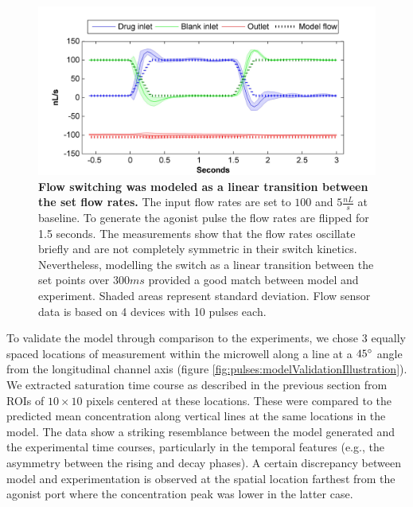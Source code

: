   \begin{figure}[!htb]
       \centering
       \includegraphics[width=15cm]{chapter6/figures/flowPulse/flowPulse.jpg}
       \caption[Measured and model flow rate switches during an agonist pulse]{\textbf{Flow switching was modeled as a linear transition between the set flow rates.} The input flow rates are set to \(100\) and \(5\frac{nL}{s}\) at baseline. To generate the agonist pulse the flow rates are flipped for 1.5 seconds. The measurements show that the flow rates oscillate briefly and are not completely symmetric in their switch kinetics. Nevertheless, modelling the switch as a linear transition between the set points over \(300ms\) provided a good match between model and experiment. Shaded areas represent standard deviation. Flow sensor data is based on 4 devices with 10 pulses each.}
       \label{fig:pulses:flowPulse}
  \end{figure}

To validate the model through comparison to the experiments, we chose 3 equally spaced locations of measurement within the microwell along a line at a \(45\degree\) angle from the longitudinal channel axis (figure \ref{fig:pulses:modelValidationIllustration}). We extracted saturation time course as described in the previous section from ROIs of \(10\times 10\) pixels centered at these locations. These were compared to the predicted mean concentration along vertical lines at the same locations in the model. The data show a striking resemblance between the model generated and the experimental time courses, particularly in the temporal features (e.g., the asymmetry between the rising and decay phases). A certain discrepancy between model and experimentation is observed at the spatial location farthest from the agonist port where the concentration peak was lower in the latter case.



